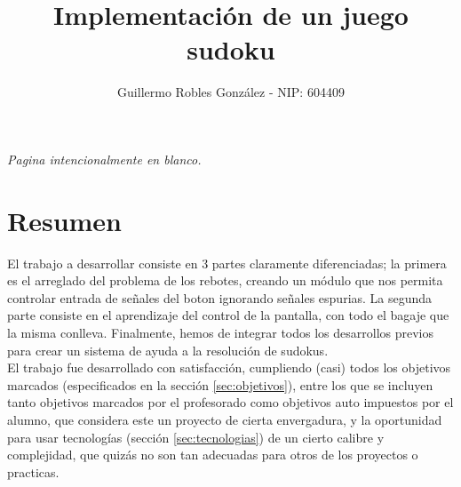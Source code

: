 \documentclass[12pt,letterpaper]{article}
\title{Implementación de un juego sudoku} %
\author{Guillermo Robles González - NIP: 604409}
\newcommand*{\blankpage}[1]{%
\vspace*{\fill}
\begin{center} \textit{#1} \end{center}
\vspace{\fill}
\clearpage}
\begin{document}
\shorthandoff{>}
\shorthandoff{<}
\maketitle
\blankpage{Pagina intencionalmente en blanco.}
\tableofcontents
\clearpage
\section{Resumen}
\label{sec:resumen}
El trabajo a desarrollar consiste en 3 partes claramente
diferenciadas; la primera es el arreglado del problema de los rebotes,
creando un módulo que nos permita controlar entrada de señales del
boton ignorando señales espurias. La segunda parte consiste en el
aprendizaje del control de la pantalla, con todo el bagaje que la
misma conlleva. Finalmente, hemos de integrar todos los desarrollos
previos para crear un sistema de ayuda a la resolución de sudokus.\\

El trabajo fue desarrollado con satisfacción, cumpliendo (casi) todos
los objetivos marcados (especificados en la sección
\ref{sec:objetivos}), entre los que se incluyen tanto objetivos
marcados por el profesorado como objetivos auto impuestos por el
alumno, que considera este un proyecto de cierta envergadura, y la
oportunidad para usar tecnologías (sección \ref{sec:tecnologias}) de
un cierto calibre y complejidad, que quizás no son tan adecuadas para
otros de los proyectos o practicas.
\end{document}
